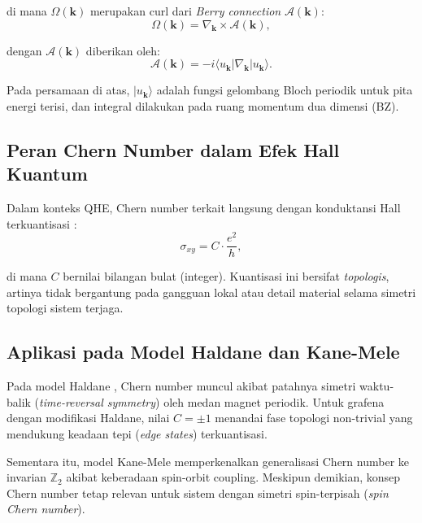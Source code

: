 di mana $\Omega(\mathbf{k})$ merupakan curl dari \textit{Berry connection} $\mathcal{A}(\mathbf{k})$:
\begin{equation}
    \Omega(\mathbf{k}) = \nabla_{\mathbf{k}} \times \mathcal{A}(\mathbf{k}),
\end{equation}

dengan $\mathcal{A}(\mathbf{k})$ diberikan oleh:
\begin{equation}
    \mathcal{A}(\mathbf{k}) = -i \langle u_{\mathbf{k}} | \nabla_{\mathbf{k}} | u_{\mathbf{k}} \rangle.
\end{equation}

Pada persamaan di atas, $|u_{\mathbf{k}}\rangle$ adalah fungsi gelombang Bloch periodik untuk pita energi terisi, dan integral dilakukan pada ruang momentum dua dimensi (BZ).

\subsection*{Peran Chern Number dalam Efek Hall Kuantum}
\label{subsec:chern_hall}

Dalam konteks QHE, Chern number terkait langsung dengan konduktansi Hall terkuantisasi \parencite{PhysRevLett.61.2015}:
\begin{equation}
    \sigma_{xy} = C \cdot \frac{e^2}{h},
    \label{eq:quantized_conductance}
\end{equation}

di mana $C$ bernilai bilangan bulat (integer). Kuantisasi ini bersifat \textit{topologis}, artinya tidak bergantung pada gangguan lokal atau detail material selama simetri topologi sistem terjaga.

\subsection*{Aplikasi pada Model Haldane dan Kane-Mele}
\label{subsec:chern_models}

Pada model Haldane \parencite{PhysRevLett.61.2015}, Chern number muncul akibat patahnya simetri waktu-balik (\textit{time-reversal symmetry}) oleh medan magnet periodik. Untuk grafena dengan modifikasi Haldane, nilai $C = \pm 1$ menandai fase topologi non-trivial yang mendukung keadaan tepi (\textit{edge states}) terkuantisasi.

Sementara itu, model Kane-Mele \parencite{PhysRevLett.95.226801} memperkenalkan generalisasi Chern number ke invarian $\mathbb{Z}_2$ akibat keberadaan spin-orbit coupling. Meskipun demikian, konsep Chern number tetap relevan untuk sistem dengan simetri spin-terpisah (\textit{spin Chern number}).

